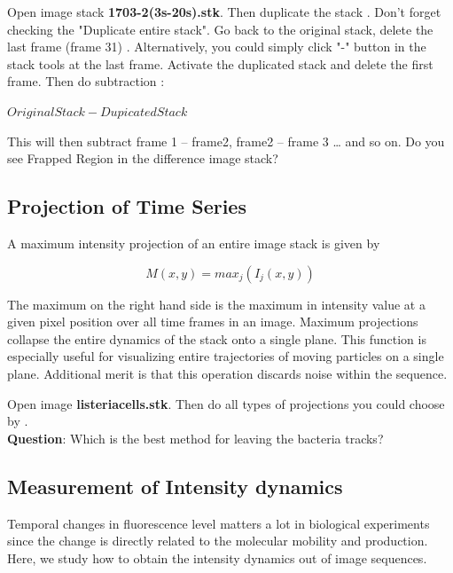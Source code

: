 \begin{indentexercise}{1}
Open image stack \textbf{1703-2(3s-20s).stk}.
Then duplicate the stack .
Don't forget checking the "Duplicate entire stack". 
Go back to the original stack, delete the last frame (frame 31) . Alternatively, you could simply click "-" button in the stack tools at the last frame. 
Activate the duplicated stack and delete the first frame.
Then do subtraction :

\tab $Original Stack - Dupicated Stack$

This will then subtract frame 1 -- frame2, frame2 -- frame 3 \ldots
and so on. Do you see Frapped Region in the difference image stack?
\end{indentexercise}

\subsection{Projection of Time Series}

A maximum intensity projection of an entire image stack is given by

\begin{equation}
M(x,y) =max_{j}(I_{j}(x,y))
\end{equation}

The maximum on the right hand side is the maximum in intensity value at
a given pixel position over all time frames in an image. Maximum
projections collapse the entire dynamics of the stack onto a single
plane. This function is especially useful for visualizing entire
trajectories of moving particles on a single plane. Additional merit is that this operation discards noise within the sequence. 

\begin{indentexercise}{1}
Open image \textbf{listeriacells.stk}.
Then do all types of projections you could choose by .\\
\textbf{Question}: Which is the best method for leaving the bacteria tracks?
\end{indentexercise}

\subsection{Measurement of Intensity dynamics}

Temporal changes in fluorescence level matters a lot in biological
experiments since the change is directly related to the molecular
mobility and production. Here, we study how to obtain the intensity
dynamics out of image sequences.

